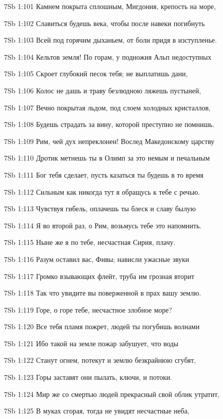 \vs 7Sb 1:101 Камнем покрыта сплошным, Мигдония, крепость на море, 

\vs 7Sb 1:102 Славиться будешь века, чтобы после навеки погибнуть

\vs 7Sb 1:103 Всей под горячим дыханьем, от боли придя в изступленье.

\vs 7Sb 1:104 Кельтов земля! По горам, у подножия Альп недоступных 

\vs 7Sb 1:105 Скроет глубокий песок тебя; не выплатишь дани, 

\vs 7Sb 1:106 Колос не дашь и траву  безлюдною ляжешь пустыней, 

\vs 7Sb 1:107 Вечно покрытая льдом, под слоем холодных кристаллов, 

\vs 7Sb 1:108 Будешь страдать за вину, которой преступно не помнишь.

\vs 7Sb 1:109 Рим, чей дух непреклонен! Вослед Македонскому царству 

\vs 7Sb 1:110 Дротик метнешь ты в Олимп  за это немым и печальным 

\vs 7Sb 1:111 Бог тебя сделает, пусть казаться ты будешь в то время 

\vs 7Sb 1:112 Сильным как никогда  тут я обращусь к тебе с речью. 

\vs 7Sb 1:113 Чувствуя гибель, оплачешь ты блеск и славу былую  

\vs 7Sb 1:114 Я во второй раз, о Рим, возьмусь тебе это напомнить.

\vs 7Sb 1:115 Ныне же я по тебе, несчастная Сирия, плачу.

\vs 7Sb 1:116 Разум оставил вас, Фивы; нависли ужасные звуки 

\vs 7Sb 1:117 Громко взывающих флейт, труба им грозная вторит  

\vs 7Sb 1:118 Так что увидите вы поверженной в прах вашу землю.

\vs 7Sb 1:119 Горе, о горе тебе, несчастное злобное море?

\vs 7Sb 1:120 Все тебя пламя пожрет, людей ты погубишь волнами 

\vs 7Sb 1:121 Ибо такой на земле пожар забушует, что воды 

\vs 7Sb 1:122 Станут огнем, потекут и землю безкрайнюю сгубят, 

\vs 7Sb 1:123 Горы заставят они пылать, ключи, и потоки. 

\vs 7Sb 1:124 Мир же со смертью людей прекрасный свой облик утратит, 

\vs 7Sb 1:125 В муках сгорая, тогда не увидят несчастные неба,

